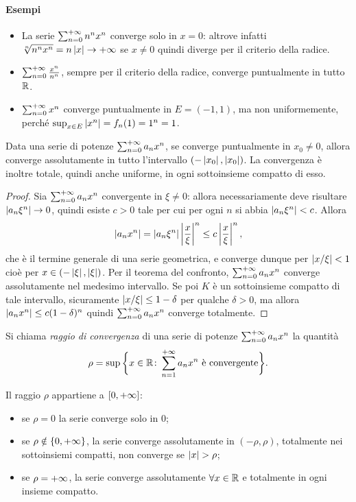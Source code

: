 \paragraph{Esempi}
\begin{itemize}
\item La serie $\sum_{{n}=0}^{+\infty}n^nx^n$ converge solo in $x=0$: altrove infatti $\sqrt[n]{n^nx^n}=n\left|{x}\right|\to+\infty$ se $x\neq 0$ quindi diverge per il criterio della radice.
\item $\sum_{{n}=0}^{+\infty}\frac{x^n}{n^n}$, sempre per il criterio della radice, converge puntualmente in tutto $\mathbb{R}$.
\item $\sum_{{n}=0}^{+\infty}x^n$ converge puntualmente in $E=(-1,1)$, ma non uniformemente, perché $\sup_{x\in E}\left|{x^n}\right|=f_n(1)=1^n=1$.
\end{itemize}
\begin{teorema}
Data una serie di potenze $\sum_{{n}=0}^{+\infty}a_nx^n$, se converge puntualmente in $x_0\neq 0$, allora converge assolutamente in tutto l'intervallo $(-\left|{x_0}\right|,\left|{x_0}\right|)$. La convergenza è inoltre totale, quindi anche uniforme, in ogni sottoinsieme compatto di esso.
\end{teorema}
\begin{proof}
Sia $\sum_{{n}=0}^{+\infty}a_nx^n$ convergente in $\xi\neq 0$: allora necessariamente deve risultare $\left|{a_n\xi^n}\right|\to 0$, quindi esiste $c>0$ tale per cui per ogni $n$ si abbia $\left|{a_n\xi^n}\right|<c$. Allora
\[
\left|{a_nx^n}\right|=\left|{a_n\xi^n}\right|\left|{\frac{x}{\xi}}\right|^n\leq c\left|{\frac{x}{\xi}}\right|^n,
\]
che è il termine generale di una serie geometrica, e converge dunque per $\left|{x/\xi}\right|<1$ cioè per $x\in(-\left|{\xi}\right|,\left|{\xi}\right|)$. Per il teorema del confronto, $\sum_{{n}=0}^{+\infty}a_nx^n$ converge assolutamente nel medesimo intervallo.
Se poi $K$ è un sottoinsieme compatto di tale intervallo, sicuramente $\left|{x/\xi}\right|\leq 1-\delta$ per qualche $\delta>0$, ma allora $\left|{a_nx^n}\right|\leq c(1-\delta)^n$ quindi $\sum_{{n}=0}^{+\infty}a_nx^n$ converge totalmente.
\end{proof}
\begin{definizione}
Si chiama \emph{raggio di convergenza} di una serie di potenze $\sum_{{n}=0}^{+\infty}a_nx^n$ la quantità
\[
\rho=\sup\bigg\{x\in\mathbb{R}\colon\sum_{{n}=1}^{+\infty}a_nx^n\text{ è convergente}\bigg\}.
\]
\end{definizione}
Il raggio $\rho$ appartiene a $[0,+\infty]$:
\begin{itemize}
\item se $\rho=0$ la serie converge solo in 0;
\item se $\rho\notin\{0,+\infty\}$, la serie converge assolutamente in $(-\rho,\rho)$, totalmente nei sottoinsiemi compatti, non converge se $\abs{x}>\rho$;
\item se $\rho=+\infty$, la serie converge assolutamente $\forall x\in\mathbb{R}$ e totalmente in ogni insieme compatto.
\end{itemize}
